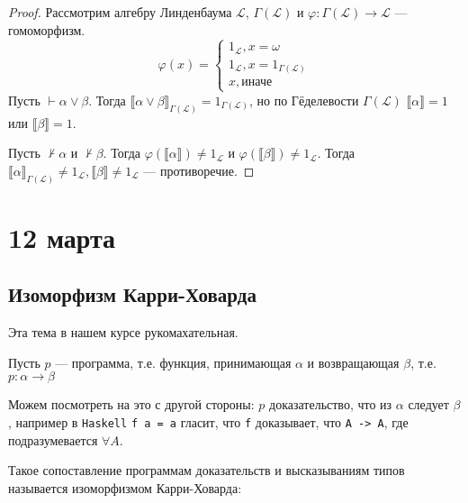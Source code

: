 \documentclass[12pt, a4paper, oneside]{book}
\begin{document}
\begin{proof}
    Рассмотрим алгебру Линденбаума \(\mathcal{L}\), \(\Gamma(\mathcal{L})\) и \(\varphi : \Gamma(\mathcal{L}) \to \mathcal{L}\) --- гомоморфизм.
    \[\varphi(x) = \begin{cases}
            1_\mathcal{L}, x = \omega                  \\
            1_\mathcal{L}, x = 1_{\Gamma(\mathcal{L})} \\
            x, \text{иначе}
        \end{cases}\]
    Пусть \(\vdash \alpha \lor \beta\). Тогда \(\llbracket \alpha \lor \beta \rrbracket_{\Gamma(\mathcal{L})} = 1_{\Gamma(\mathcal{L})}\), но по Гёделевости \(\Gamma(\mathcal{L})\) \(\llbracket \alpha \rrbracket = 1\) или \(\llbracket \beta \rrbracket = 1\).

    Пусть \(\nvdash \alpha\) и \(\nvdash \beta\). Тогда \(\varphi(\llbracket \alpha \rrbracket) \neq 1_{\mathcal{L}}\) и \(\varphi(\llbracket \beta \rrbracket) \neq 1_{\mathcal{L}}\). Тогда \(\llbracket \alpha \rrbracket_{\Gamma(\mathcal{L})} \neq 1_\mathcal{L}, \llbracket \beta \rrbracket \neq 1_\mathcal{L}\) --- противоречие.
\end{proof}

\chapter{12 марта}

\section{Изоморфизм Карри-Ховарда}

\begin{remark}
    Эта тема в нашем курсе рукомахательная.
\end{remark}

Пусть \(p\) --- программа, т.е. функция, принимающая \(\alpha\) и возвращающая \(\beta\), т.е. \(p : \alpha \to \beta\)

Можем посмотреть на это с другой стороны: \(p\) доказательство, что из \(\alpha\) следует \(\beta\), например в \texttt{Haskell} \texttt{f a = a} гласит, что \texttt{f} доказывает, что \texttt{A -> A}, где подразумевается \(\forall A\).

Такое сопоставление программам доказательств и высказываниям типов называется изоморфизмом Карри-Ховарда:
\end{document}
